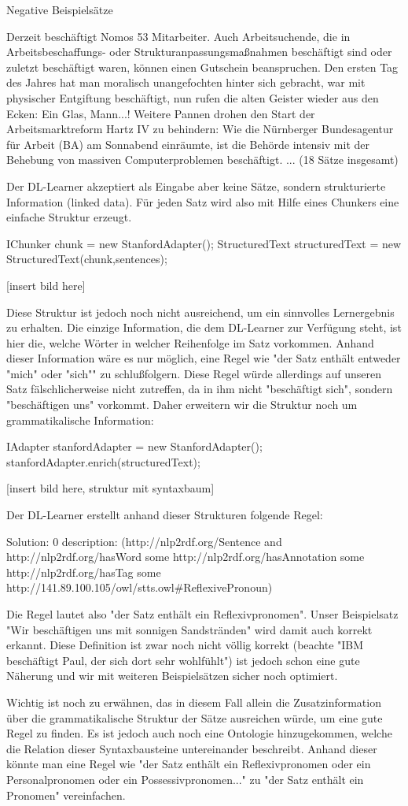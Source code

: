 Negative Beispielsätze

Derzeit beschäftigt Nomos 53 Mitarbeiter.
Auch Arbeitsuchende, die in Arbeitsbeschaffungs- oder Strukturanpassungsmaßnahmen beschäftigt sind oder zuletzt beschäftigt waren, können einen Gutschein beanspruchen.
Den ersten Tag des Jahres hat man moralisch unangefochten hinter sich gebracht, war mit physischer Entgiftung beschäftigt, nun rufen die alten Geister wieder aus den Ecken: Ein Glas, Mann...!
Weitere Pannen drohen den Start der Arbeitsmarktreform Hartz IV zu behindern: Wie die Nürnberger Bundesagentur für Arbeit (BA) am Sonnabend einräumte, ist die Behörde intensiv mit der Behebung von massiven Computerproblemen beschäftigt.
... (18 Sätze insgesamt)

Der DL-Learner akzeptiert als Eingabe aber keine Sätze, sondern strukturierte Information (linked data).
Für jeden Satz wird also mit Hilfe eines Chunkers eine einfache Struktur erzeugt.

IChunker chunk = new StanfordAdapter();
StructuredText structuredText = new StructuredText(chunk,sentences);

[insert bild here]

Diese Struktur ist jedoch noch nicht ausreichend, um ein sinnvolles Lernergebnis zu erhalten.
Die einzige Information, die dem DL-Learner zur Verfügung steht, ist hier die, welche Wörter in welcher Reihenfolge im Satz vorkommen.
Anhand dieser Information wäre es nur möglich, eine Regel wie "der Satz enthält entweder "mich" oder "sich"" zu schlußfolgern.
Diese Regel würde allerdings auf unseren Satz fälschlicherweise nicht zutreffen, da in ihm nicht "beschäftigt sich", sondern "beschäftigen uns" vorkommt.
Daher erweitern wir die Struktur noch um grammatikalische Information:

IAdapter stanfordAdapter = new StanfordAdapter();
stanfordAdapter.enrich(structuredText);

[insert bild here, struktur mit syntaxbaum]

Der DL-Learner erstellt anhand dieser Strukturen folgende Regel:

Solution: 0
description:
(http://nlp2rdf.org/Sentence and http://nlp2rdf.org/hasWord some http://nlp2rdf.org/hasAnnotation some http://nlp2rdf.org/hasTag some http://141.89.100.105/owl/stts.owl#ReflexivePronoun)

Die Regel lautet also "der Satz enthält ein Reflexivpronomen". 
Unser Beispielsatz "Wir beschäftigen uns mit sonnigen Sandstränden" wird damit auch korrekt erkannt. Diese Definition ist zwar noch nicht völlig korrekt (beachte \zb{} "IBM beschäftigt Paul, der sich dort sehr wohlfühlt") ist jedoch schon eine gute Näherung und wir mit weiteren Beispielsätzen sicher noch optimiert.

Wichtig ist noch zu erwähnen, das in diesem Fall allein die Zusatzinformation über die grammatikalische Struktur der Sätze ausreichen würde, um eine gute Regel zu finden.
Es ist jedoch auch noch eine Ontologie hinzugekommen, welche die Relation dieser Syntaxbausteine untereinander beschreibt.
Anhand dieser könnte man eine Regel wie "der Satz enthält ein Reflexivpronomen oder ein Personalpronomen oder ein Possessivpronomen..." zu "der Satz enthält ein Pronomen" vereinfachen.

